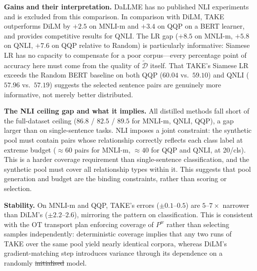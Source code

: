 \documentclass[12pt, a4paper, twoside]{book}
\makeatletter
\numberwithin{equation}{chapter}
\theoremstyle{plain}
\theoremstyle{definition}
\theoremstyle{remark}
\newenvironment{foldable}{}{}
\providecommand{\DIFaddtex}[1]{{\protect\color{blue}\uwave{#1}}} %
\providecommand{\DIFdeltex}[1]{{\protect\color{red}\sout{#1}}} %
\providecommand{\DIFaddbegin}{} %
\providecommand{\DIFaddend}{} %
\providecommand{\DIFdelbegin}{} %
\providecommand{\DIFdelend}{} %
\providecommand{\DIFadd}[1]{\texorpdfstring{\DIFaddtex{#1}}{#1}} %
\providecommand{\DIFdel}[1]{\texorpdfstring{\DIFdeltex{#1}}{}} %
\newcommand{\DIFscaledelfig}{0.5}
\newlength{\DIFdelgraphicswidth} %
\newlength{\DIFdelgraphicsheight} %
\newcommand{\DIFaddincludegraphics}[2][]{{\color{blue}\fbox{\DIFOincludegraphics[#1]{#2}}}} %
\newcommand{\DIFdelincludegraphics}[2][]{%
\sbox{\DIFdelgraphicsbox}{\DIFOincludegraphics[#1]{#2}}%
\settoboxwidth{\DIFdelgraphicswidth}{\DIFdelgraphicsbox} %
\settoboxtotalheight{\DIFdelgraphicsheight}{\DIFdelgraphicsbox} %
\scalebox{\DIFscaledelfig}{%
\parbox[b]{\DIFdelgraphicswidth}{\usebox{\DIFdelgraphicsbox}\\[-\baselineskip] \rule{\DIFdelgraphicswidth}{0em}}\llap{\resizebox{\DIFdelgraphicswidth}{\DIFdelgraphicsheight}{%
\setlength{\unitlength}{\DIFdelgraphicswidth}%
\begin{picture}(1,1)%
\thicklines\linethickness{2pt} %
{\color[rgb]{1,0,0}\put(0,0){\framebox(1,1){}}}%
{\color[rgb]{1,0,0}\put(0,0){\line( 1,1){1}}}%
{\color[rgb]{1,0,0}\put(0,1){\line(1,-1){1}}}%
\end{picture}%
}\hspace*{3pt}}} %
} %
\DeclareRobustCommand{\DIFaddbegin}{\DIFOaddbegin \let\includegraphics\DIFaddincludegraphics} %
\DeclareRobustCommand{\DIFaddend}{\DIFOaddend \let\includegraphics\DIFOincludegraphics} %
\DeclareRobustCommand{\DIFdelbegin}{\DIFOdelbegin \let\includegraphics\DIFdelincludegraphics} %
\DeclareRobustCommand{\DIFdelend}{\DIFOaddend \let\includegraphics\DIFOincludegraphics} %
\let\sout@orig\sout %
\renewcommand{\sout}[1]{\ifmmode\text{\sout@orig{\ensuremath{#1}}}\else\sout@orig{#1}\fi} %
\makeatother
\begin{document}
\begin{foldable} \textbf{Gains and their interpretation.}
  DaLLME has no published \ac{NLI} experiments and is excluded from this comparison.
  In comparison with DiLM, TAKE outperforms DiLM by $+2.5$ on MNLI-m and $+3.4$ on QQP on a BERT learner, and provides competitive results for QNLI.
  The LR gap ($+8.5$ on MNLI-m, $+5.8$ on QNLI, $+7.6$ on QQP relative to Random) is particularly informative: Siamese LR has no capacity to compensate for a poor corpus---every percentage point of accuracy here must come from the quality of $\tilde{\mathcal{D}}$ itself.
  That TAKE's Siamese LR exceeds the Random BERT baseline on both QQP ($60.04$ vs.\ $59.10$) and QNLI ($57.96$ vs.\ $57.19$) suggests the selected sentence pairs are genuinely more informative, not merely better distributed.
\end{foldable}

\begin{foldable} \textbf{The \ac{NLI} ceiling gap and what it implies.}
  All distilled methods fall short of the full-dataset ceiling ($86.8$ / $82.5$ / $89.5$ for MNLI-m, QNLI, QQP), a gap larger than on single-sentence tasks.
  \ac{NLI} imposes a joint constraint: the synthetic pool must contain pairs whose relationship correctly reflects each class label at extreme budget ($\approx\!60$ pairs for MNLI-m, $\approx\!40$ for QQP and QNLI, at 20/cls).
  This is a harder coverage requirement than single-sentence classification, and the synthetic pool must cover all relationship types within it.
  This suggests that pool generation and budget are the binding constraints, rather than scoring or selection.
\end{foldable}

\begin{foldable} \textbf{Stability.}
  On MNLI-m and QQP, TAKE's errors ($\pm0.1$--$0.5$) are $5$--$7\times$ narrower than DiLM's ($\pm2.2$--$2.6$), mirroring the pattern on classification.
  This is consistent with the \ac{OT} transport plan enforcing coverage of $P^w$ rather than selecting samples independently: deterministic coverage implies that any two runs of TAKE over the same pool yield nearly identical corpora, whereas DiLM's gradient-matching step introduces variance through its dependence on a randomly \DIFdelbegin \DIFdel{initialised }\DIFdelend \DIFaddbegin \DIFadd{initialized }\DIFaddend model.
\end{foldable}
\end{document}
